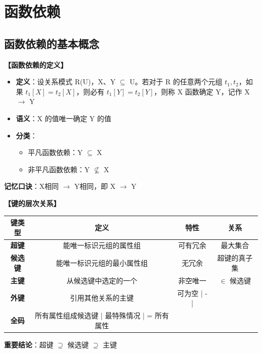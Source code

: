 \documentclass[12pt, a4paper]{article}
\newenvironment{bluebox}[1]{%
  \begin{trivlist}
  \item[\hskip\labelsep \textbf{#1}]
  \setlength{\parskip}{0.5ex}
  \setlength{\itemsep}{0.5ex}
}{%
  \end{trivlist}
  }
\begin{document}
\section{函数依赖}

\subsection{函数依赖的基本概念}

\begin{bluebox}{函数依赖定义}
	\textbf{【函数依赖的定义】}

	\begin{itemize}[leftmargin=*, nosep]
		\item \textbf{定义}：设关系模式 R(U)，X、Y $\subseteq$ U。若对于 R 的任意两个元组 $t_1, t_2$，如果 $t_1[X] = t_2[X]$，则必有 $t_1[Y] = t_2[Y]$，则称 X 函数确定 Y，记作 X $\to$ Y
		\item \textbf{语义}：X 的值唯一确定 Y 的值
		\item \textbf{分类}：
		      \begin{itemize}
			      \item 平凡函数依赖：Y $\subseteq$ X
			      \item 非平凡函数依赖：Y $\not\subseteq$ X
		      \end{itemize}
	\end{itemize}

	\textbf{记忆口诀}：X相同 $\to$ Y相同，即 X $\to$ Y
\end{bluebox}

\begin{bluebox}{键的概念}
	\textbf{【键的层次关系】}

	\begin{tabular}{|c|c|c|c|}
		\hline
		\textbf{键类型} & \textbf{定义}                & \textbf{特性} & \textbf{关系} \\
		\hline
		\textbf{超键}  & 能唯一标识元组的属性组                & 可有冗余        & 最大集合        \\
		\hline
		\textbf{候选键} & 能唯一标识元组的最小属性组              & 无冗余         & 超键的真子集      \\
		\hline
		\textbf{主键}  & 从候选键中选定的一个                 & 非空唯一        & $\in$ 候选键   \\
		\hline
		\textbf{外键}  & 引用其他关系的主键                  & 可为空 | - |                 \\
		\hline
		\textbf{全码}  & 所有属性组成候选键 | 最特殊情况 | = 所有属性                             \\
		\hline
	\end{tabular}

	\textbf{重要结论}：超键 $\supseteq$ 候选键 $\supseteq$ 主键
\end{bluebox}
\end{document}
